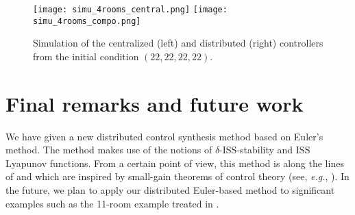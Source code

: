 \begin{figure}[ht]
 \centering
 \texttt{[image: simu\_4rooms\_central.png]}%
%
 \texttt{[image: simu\_4rooms\_compo.png]}
 \caption{Simulation of the centralized (left) and distributed (right) controllers
 from the initial condition $(22,22,22,22)$.}
  \label{fig:simu_4rooms}
\end{figure}

 \section{Final remarks and future work}\label{sec:conc_part4}

 We have given a new distributed control synthesis method based on
 Euler's method.  The method makes use of the notions of
 $\delta$-ISS-stability and ISS Lyapunov functions.  From a certain
 point of view, this method is along the lines of
 \cite{dallal2015compositional} and \cite{kim2015compositional} which
 are inspired by small-gain theorems of control theory (see,
 \textit{e.g.}, \cite{jiang1994small}). In the future, we plan to
 apply our distributed Euler-based method to significant examples such
 as the 11-room example treated in
 \cite{larsen2015online,le2016distributed}.





